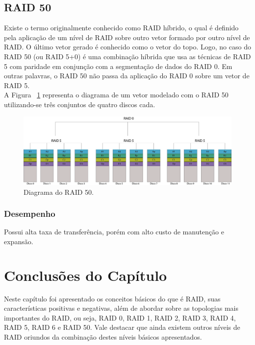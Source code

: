 \subsection{RAID 50}
Existe o termo originalmente conhecido como RAID híbrido, o qual é definido pela aplicação de um nível de RAID sobre outro vetor formado por outro nível de RAID. O último vetor gerado é conhecido como o vetor do topo. Logo, no caso do RAID 50 (ou RAID 5+0) é uma combinação híbrida que usa as técnicas de RAID 5 com paridade em conjunção com a segmentação de dados do RAID 0. Em outras palavras, o RAID 50 não passa da aplicação do RAID 0 sobre um vetor de RAID 5. \\

A Figura ~\ref{fig:raid50} representa o diagrama de um vetor modelado com o RAID 50 utilizando-se três conjuntos de quatro discos cada.\\

\begin{figure}[htb]
	\begin{center}
		
		\includegraphics[clip,scale=0.2]{images/RAID_50.png}
		\caption{Diagrama do RAID 50. }
		\label{fig:raid50}
	\end{center}
\end{figure} 

\subsubsection{Desempenho}
Possui alta taxa de transferência, porém com alto custo de manutenção e expansão.


\section{Conclusões do Capítulo}
Neste capítulo foi apresentado os conceitos básicos do que é RAID, suas características positivas e negativas, além de abordar sobre as topologias mais importantes do RAID, ou seja, RAID 0, RAID 1, RAID 2, RAID 3, RAID 4, RAID 5, RAID 6 e RAID 50. Vale destacar que ainda existem outros níveis de RAID oriundos da combinação destes níveis básicos apresentados.








